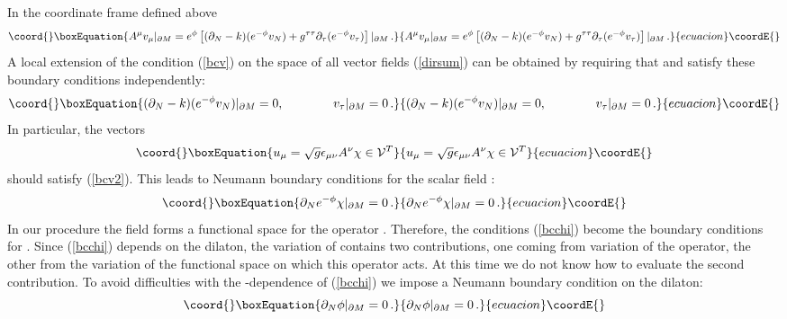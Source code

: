 \documentclass[a4paper,12pt]{article}
\providecommand{\oB}{|_{\partial M}}
\begin{document}
In the coordinate frame defined above
\begin{equation}\coord{}\boxEquation{
A^\mu v_\mu \oB = e^\phi \left[ (\partial_N -k)(e^{-\phi}v_N)
+g^{\tau\tau}\partial_\tau (e^{-\phi }v_\tau )\right]\oB \,.\label{1712}
}{
A^\mu v_\mu \oB = e^\phi \left[ (\partial_N -k)(e^{-\phi}v_N)
+g^{\tau\tau}\partial_\tau (e^{-\phi }v_\tau )\right]\oB \,.}{ecuacion}\coordE{}\end{equation}
A local extension of the condition (\ref{bcv}) on the space of
all vector fields \coordHE{} (\ref{dirsum}) can be obtained
by requiring that \coordHE{} and \coordHE{} satisfy these boundary
conditions independently:
\begin{equation}\coord{}\boxEquation{
(\partial_N -k)(e^{-\phi}v_N )\oB =0,\qquad\qquad
v_\tau \oB =0\,.
\label{bcv2}
}{
(\partial_N -k)(e^{-\phi}v_N )\oB =0,\qquad\qquad
v_\tau \oB =0\,.
}{ecuacion}\coordE{}\end{equation}
In particular, the vectors 
\begin{equation}\coord{}\boxEquation{
u_\mu =\sqrt{g}\epsilon_{\mu\nu}A^\nu \chi \in {\cal V}^T
}{
u_\mu =\sqrt{g}\epsilon_{\mu\nu}A^\nu \chi \in {\cal V}^T
}{ecuacion}\coordE{}\end{equation}
should satisfy (\ref{bcv2}). This leads to Neumann boundary
conditions for the scalar field \myHighlight{$\chi$}\coordHE{}:
\begin{equation}\coord{}\boxEquation{
\partial_N e^{-\phi} \chi \oB =0 \,. \label{bcchi}
}{
\partial_N e^{-\phi} \chi \oB =0 \,. }{ecuacion}\coordE{}\end{equation}
In our procedure the field \myHighlight{$\chi$}\coordHE{} forms a functional space
for the operator \myHighlight{$\Delta_-$}\coordHE{}. Therefore, the conditions (\ref{bcchi})
become the boundary conditions for \myHighlight{$\Delta_-$}\coordHE{}. Since (\ref{bcchi})
depends on the dilaton, the variation of \myHighlight{$\det \Delta_-$}\coordHE{} contains
two contributions, one coming from variation of the operator,
the other from the variation of the functional space on which this
operator acts. At this time we do not know how to evaluate
the second contribution. To avoid difficulties with the 
\myHighlight{$\phi$}\coordHE{}-dependence of (\ref{bcchi}) we impose a Neumann boundary
condition on the dilaton:
\begin{equation}\coord{}\boxEquation{
\partial_N\phi \oB =0 \,.\label{bcphi}
}{
\partial_N\phi \oB =0 \,.}{ecuacion}\coordE{}\end{equation}
\end{document}
